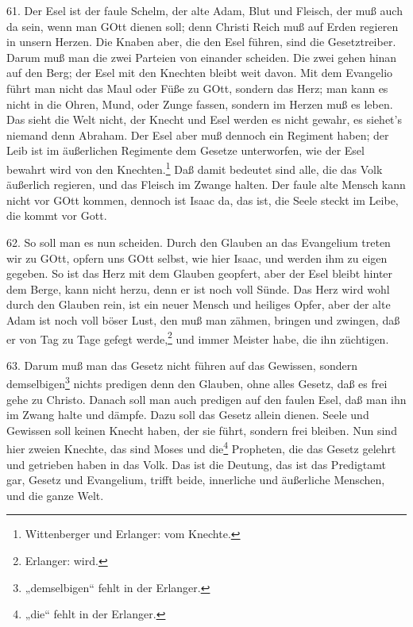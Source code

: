 61. Der Esel ist der faule Schelm, der alte Adam, Blut und Fleisch, der muß auch da sein, wenn man GOtt dienen soll; denn Christi Reich muß auf Erden regieren in unsern Herzen. Die Knaben aber, die den Esel führen, sind die Gesetztreiber. Darum muß man die zwei Parteien von einander scheiden. Die zwei gehen hinan auf den Berg; der Esel mit den Knechten bleibt weit davon. Mit dem Evangelio führt man nicht das Maul oder Füße zu GOtt, sondern das Herz; man kann es nicht in die Ohren, Mund, oder Zunge fassen, sondern im Herzen muß es leben. Das sieht die Welt nicht, der Knecht und Esel werden es nicht gewahr, es siehet's niemand denn Abraham. Der Esel aber muß dennoch ein Regiment haben; der Leib ist im äußerlichen Regimente dem Gesetze unterworfen, wie der Esel bewahrt wird von den Knechten.\footnote{Wittenberger und Erlanger: vom Knechte.} Daß damit bedeutet sind alle, die das Volk äußerlich regieren, und das Fleisch im Zwange halten. Der faule alte Mensch kann nicht vor GOtt kommen, dennoch ist Isaac da, das ist, die Seele steckt im Leibe, die kommt vor Gott.

62. So soll man es nun scheiden. Durch den Glauben an das Evangelium treten wir zu GOtt, opfern uns GOtt selbst, wie hier Isaac, und werden ihm zu eigen gegeben. So ist das Herz mit dem Glauben geopfert, aber der Esel bleibt hinter dem Berge, kann nicht herzu, denn er ist noch voll Sünde. Das Herz wird wohl durch den Glauben rein, ist ein neuer Mensch und heiliges Opfer, aber der alte Adam ist noch voll böser Lust, den muß man zähmen, bringen und zwingen, daß er von Tag zu Tage gefegt werde,\footnote{Erlanger: wird.} und immer Meister habe, die ihn züchtigen.

63. Darum muß man das Gesetz nicht führen auf das Gewissen, sondern demselbigen\footnote{„demselbigen“ fehlt in der Erlanger.} nichts predigen denn den Glauben, ohne alles Gesetz, daß es frei gehe zu Christo. Danach soll man auch predigen auf den faulen Esel, daß man ihn im Zwang halte und dämpfe. Dazu soll das Gesetz allein dienen. Seele und Gewissen soll keinen Knecht haben, der sie führt, sondern frei bleiben. Nun sind hier zweien Knechte, das sind Moses und die\footnote{„die“ fehlt in der Erlanger.} Propheten, die das Gesetz gelehrt und getrieben haben in das Volk. Das ist die Deutung, das ist das Predigtamt gar, Gesetz und Evangelium, trifft beide, innerliche und äußerliche Menschen, und die ganze Welt.

